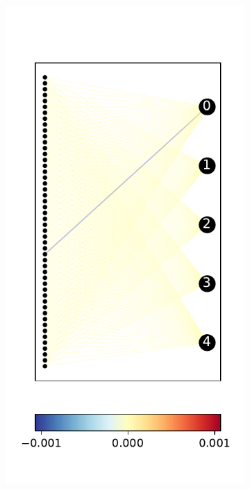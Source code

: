 \documentclass{easychair}
\begin{document}
\begin{figure}
\centering
\begin{subfigure}{0.2\linewidth}
  \includegraphics[width=\linewidth]{./images/ACASXU_2_9_0_vals.pdf}
\end{subfigure}

\end{figure}
\end{document}
